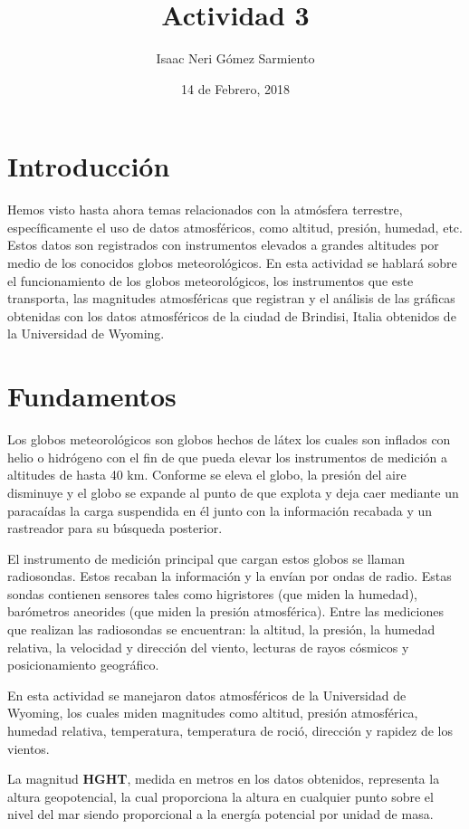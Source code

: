 \documentclass[a4paper]{article}
\title{Actividad 3}
\author{Isaac Neri Gómez Sarmiento}
\date{14 de Febrero, 2018}
\begin{document}
\maketitle


\section{Introducción}

Hemos visto hasta ahora temas relacionados con la atmósfera terrestre, específicamente el uso de datos atmosféricos, como altitud, presión, humedad, etc. Estos datos son registrados con instrumentos elevados a grandes altitudes por medio de los conocidos globos meteorológicos.
En esta actividad se hablará sobre el funcionamiento de los globos meteorológicos, los instrumentos que este transporta, las magnitudes atmosféricas que registran y el análisis de las gráficas obtenidas con los datos atmosféricos de la ciudad de Brindisi, Italia obtenidos de la Universidad de Wyoming. 

\section{Fundamentos}

Los globos meteorológicos son globos hechos de látex los cuales son inflados con helio o hidrógeno con el fin de que pueda elevar los instrumentos de medición a altitudes de hasta 40 km. Conforme se eleva el globo, la presión del aire disminuye y el globo se expande al punto de que explota y deja caer mediante un paracaídas la carga suspendida en él junto con la información recabada y un rastreador para su búsqueda posterior. 

El instrumento de medición principal que cargan estos globos se llaman radiosondas. Estos recaban la información y la envían por ondas de radio. Estas sondas contienen sensores tales como higristores (que miden la humedad), barómetros aneorides (que miden la presión atmosférica). Entre las mediciones que realizan las radiosondas se encuentran: la altitud, la presión, la humedad relativa, la velocidad y dirección del viento, lecturas de rayos cósmicos y posicionamiento geográfico. 

En esta actividad se manejaron datos atmosféricos de la Universidad de Wyoming, los cuales miden magnitudes como altitud, presión atmosférica, humedad relativa, temperatura, temperatura de roció, dirección y rapidez de los vientos.

La magnitud \textbf{HGHT}, medida en metros en los datos obtenidos, representa la altura geopotencial, la cual proporciona la altura en cualquier punto sobre el nivel del mar siendo proporcional a la energía potencial por unidad de masa.
\end{document}
